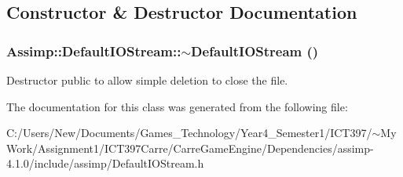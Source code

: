 \subsection{Constructor \& Destructor Documentation}
\hypertarget{class_assimp_1_1_default_i_o_stream_d21769a2e865f8522ba2ebd97b75beda}{
\subsubsection[$\sim$DefaultIOStream]{\setlength{\rightskip}{0pt plus 5cm}Assimp::DefaultIOStream::$\sim$DefaultIOStream ()}}
\label{class_assimp_1_1_default_i_o_stream_d21769a2e865f8522ba2ebd97b75beda}


Destructor public to allow simple deletion to close the file. 

The documentation for this class was generated from the following file:\begin{CompactItemize}
\item 
C:/Users/New/Documents/Games\_\-Technology/Year4\_\-Semester1/ICT397/$\sim$My Work/Assignment1/ICT397Carre/CarreGameEngine/Dependencies/assimp-4.1.0/include/assimp/DefaultIOStream.h\end{CompactItemize}

